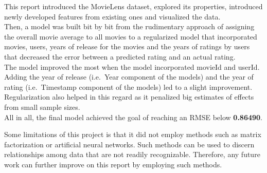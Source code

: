 \documentclass[
]{article}
\begin{document}
This report introduced the MovieLens dataset, explored its properties,
introduced newly developed features from existing ones and visualized
the data.\\

Then, a model was built bit by bit from the rudimentary approach of
assigning the overall movie average to all movies to a regularized model
that incorporated movies, users, years of release for the movies and the
years of ratings by users that decreased the error between a predicted
rating and an actual rating.\\

The model improved the most when the model incorporated movieId and
userId. Adding the year of release (i.e.~Year component of the models)
and the year of rating (i.e.~Timestamp component of the models) led to a
slight improvement. Regularization also helped in this regard as it
penalized big estimates of effects from small sample sizes.\\

All in all, the final model achieved the goal of reaching an RMSE below
\textbf{0.86490}.

Some limitations of this project is that it did not employ methods such
as matrix factorization or artificial neural networks. Such methods can
be used to discern relationships among data that are not readily
recognizable. Therefore, any future work can further improve on this
report by employing such methods.
\end{document}
